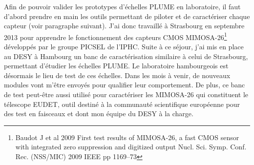 \documentclass[a4papper, 10pt]{article}
\begin{document}
        Afin de pouvoir valider les prototypes d'échelles PLUME en laboratoire, il faut d'abord prendre en main les outils permettant de piloter et de caractériser chaque capteur (voir paragraphe suivant). J'ai donc travaillé à Strasbourg en septembre 2013 pour apprendre le fonctionnement des capteurs CMOS MIMOSA-26\footnote{Baudot J et al 2009 First test results of MIMOSA-26, a fast CMOS sensor with integrated zero suppression and digitized output Nucl. Sci. Symp. Conf. Rec. (NSS/MIC) 2009 IEEE pp 1169–73} développés par le groupe PICSEL de l'IPHC.
        Suite à ce séjour, j'ai mis en place au DESY à Hambourg un banc de caractérisation similaire à celui de Strasbourg, permettant d'étudier les échelles PLUME. Le laboratoire hambourgeois est désormais le lieu de test de ces échelles. Dans les mois à venir, de nouveaux modules vont m'être envoyés pour qualifier leur comportement.
        De plus, ce banc de test peut-être aussi utilisé pour caractériser les MIMOSA-26 qui constituent le télescope EUDET, outil destiné à la communauté scientifique européenne pour des test en faisceaux et dont mon équipe du DESY à la charge.

        
\end{document}

